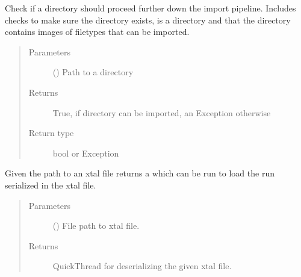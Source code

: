 \documentclass[letterpaper,10pt,english]{sphinxmanual}
\begin{document}
\begin{fulllineitems}
\begin{fulllineitems}
\label{\detokenize{polo.utils:polo.utils.io_utils.RunImporter.directory_validator}}
Check if a directory should proceed further down the import
pipeline. Includes checks to make sure the directory exists,
is a directory and that the directory contains images of
filetypes that can be imported.
\begin{quote}\begin{description}
\item[{Parameters}] \leavevmode
{} () \textendash{} Path to a directory

\item[{Returns}] \leavevmode
True, if directory can be imported, an Exception otherwise

\item[{Return type}] \leavevmode
bool or Exception

\end{description}\end{quote}

\end{fulllineitems}


\begin{fulllineitems}
\label{\detokenize{polo.utils:polo.utils.io_utils.RunImporter.import_from_xtal_thread}}
Given the path to an xtal file returns a 
which can be run to load the run serialized in the
xtal file.
\begin{quote}\begin{description}
\item[{Parameters}] \leavevmode
{} () \textendash{} File path to xtal file.

\item[{Returns}] \leavevmode
QuickThread for deserializing the given xtal file.


\end{description}
\end{quote}
\end{fulllineitems}
\end{fulllineitems}
\end{document}
